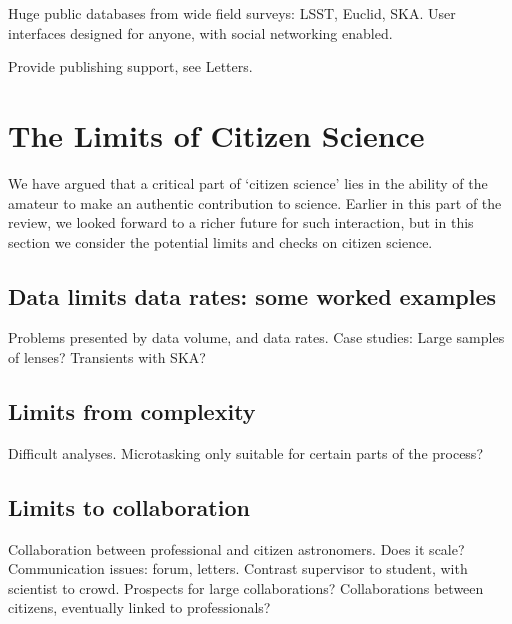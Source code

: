 \documentclass{ar2e}
\begin{document}
Huge public databases from wide field surveys: LSST, Euclid, SKA. User
interfaces designed for anyone, with social networking enabled. 

Provide publishing support, see Letters.



\section{The Limits of Citizen Science}
\label{sec:limits}

We have argued that a critical part of `citizen science' lies in the ability of the amateur to make an authentic contribution to science. Earlier in this part of the review, we looked forward to a richer future for such interaction, but in this section we consider the potential limits and checks on citizen science. 


\subsection{Data limits data rates: some worked examples}
\label{sec:limits:data}

Problems presented by data volume, and data rates. 
Case studies: Large samples of lenses?  Transients with SKA? 



\subsection{Limits from complexity}
\label{sec:limits:complexity}

Difficult analyses. Microtasking only suitable for certain parts of the process?



\subsection{Limits to collaboration}
\label{sec:limits:collab}

Collaboration between professional and citizen astronomers. Does it scale?
Communication issues: forum, letters. Contrast supervisor to student, with
scientist to crowd. Prospects for large collaborations? Collaborations between
citizens, eventually linked to professionals?
\end{document}
